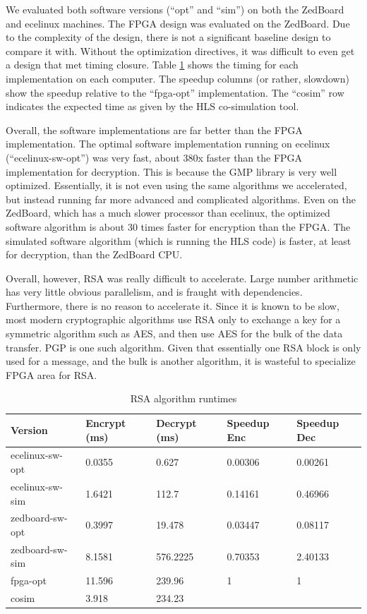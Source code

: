 We evaluated both software versions (``opt'' and ``sim'') on both the ZedBoard and ecelinux machines.
The FPGA design was evaluated on the ZedBoard. Due to the complexity of the design, there is not a 
significant baseline design to compare it with. Without the optimization directives, it was difficult
to even get a design that met timing closure. Table \ref{table:rsadata} shows the timing for each implementation
on each computer. The speedup columns (or rather, slowdown) show the speedup relative to the ``fpga-opt'' implementation.
The ``cosim'' row indicates the expected time as given by the HLS co-simulation tool.

Overall, the software implementations are far better than the FPGA implementation. The optimal 
software implementation running on ecelinux (``ecelinux-sw-opt'') was very fast, about 380x faster
than the FPGA implementation for decryption. This is because the GMP library is very well optimized.
Essentially, it is not even using the same algorithms we accelerated, but instead running far more advanced
and complicated algorithms. Even on the ZedBoard, which has a much slower processor than ecelinux, 
the optimized software algorithm is about 30 times faster for encryption than the FPGA.
The simulated software algorithm (which is running the HLS code) is faster, at least for decryption, 
than the ZedBoard CPU.

Overall, however, RSA was really difficult to accelerate. Large number arithmetic has very little obvious parallelism,
and is fraught with dependencies. Furthermore, there is no reason to accelerate it. Since it is known to be slow,
most modern cryptographic algorithms use RSA only to exchange a key for a symmetric algorithm such as AES, and then use AES
for the bulk of the data transfer. PGP is one such algorithm. Given that essentially one RSA block is only used
for a message, and the bulk is another algorithm, it is wasteful to specialize FPGA area for RSA.

\begin{table}[h]
\centering
\begin{tabular}{@{}lllll@{}}
\toprule
Version         & Encrypt (ms) & Decrypt (ms) & Speedup Enc & Speedup Dec \\ \midrule
ecelinux-sw-opt & 0.0355       & 0.627        & 0.00306     & 0.00261     \\
ecelinux-sw-sim & 1.6421       & 112.7        & 0.14161     & 0.46966     \\
zedboard-sw-opt & 0.3997       & 19.478       & 0.03447     & 0.08117     \\
zedboard-sw-sim & 8.1581       & 576.2225     & 0.70353     & 2.40133     \\
fpga-opt        & 11.596       & 239.96       & 1           & 1           \\
cosim           & 3.918        & 234.23       &             &             \\ \bottomrule
\end{tabular}
\label{table:rsadata}
\caption{RSA algorithm runtimes}
\end{table}

